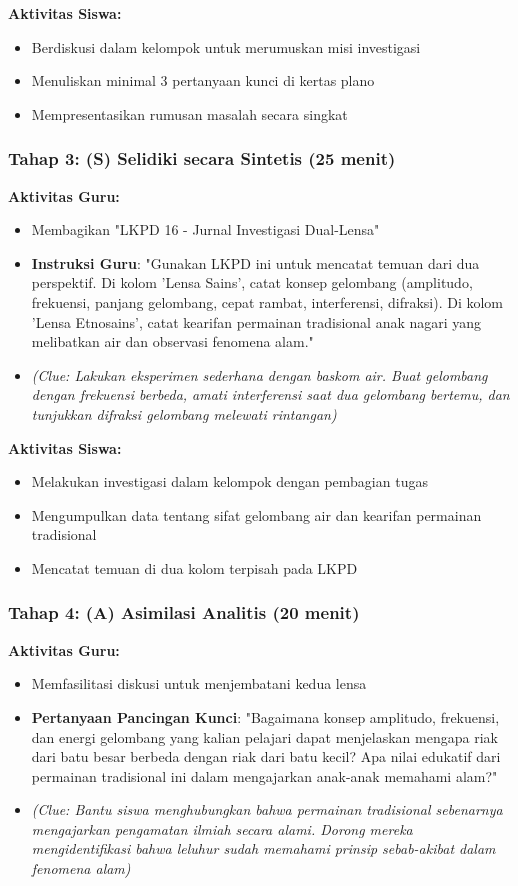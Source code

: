 \documentclass[12pt,a4paper]{article}
\begin{document}
\textbf{Aktivitas Siswa:}
\begin{itemize}
\item Berdiskusi dalam kelompok untuk merumuskan misi investigasi
\item Menuliskan minimal 3 pertanyaan kunci di kertas plano
\item Mempresentasikan rumusan masalah secara singkat
\end{itemize}

\subsubsection{Tahap 3: (S) Selidiki secara Sintetis (25 menit)}

\textbf{Aktivitas Guru:}
\begin{itemize}
\item Membagikan "LKPD 16 - Jurnal Investigasi Dual-Lensa"
\item \textbf{Instruksi Guru}: "Gunakan LKPD ini untuk mencatat temuan dari dua perspektif. Di kolom 'Lensa Sains', catat konsep gelombang (amplitudo, frekuensi, panjang gelombang, cepat rambat, interferensi, difraksi). Di kolom 'Lensa Etnosains', catat kearifan permainan tradisional anak nagari yang melibatkan air dan observasi fenomena alam."
\item \textit{(Clue: Lakukan eksperimen sederhana dengan baskom air. Buat gelombang dengan frekuensi berbeda, amati interferensi saat dua gelombang bertemu, dan tunjukkan difraksi gelombang melewati rintangan)}
\end{itemize}

\textbf{Aktivitas Siswa:}
\begin{itemize}
\item Melakukan investigasi dalam kelompok dengan pembagian tugas
\item Mengumpulkan data tentang sifat gelombang air dan kearifan permainan tradisional
\item Mencatat temuan di dua kolom terpisah pada LKPD
\end{itemize}

\subsubsection{Tahap 4: (A) Asimilasi Analitis (20 menit)}

\textbf{Aktivitas Guru:}
\begin{itemize}
\item Memfasilitasi diskusi untuk menjembatani kedua lensa
\item \textbf{Pertanyaan Pancingan Kunci}: "Bagaimana konsep amplitudo, frekuensi, dan energi gelombang yang kalian pelajari dapat menjelaskan mengapa riak dari batu besar berbeda dengan riak dari batu kecil? Apa nilai edukatif dari permainan tradisional ini dalam mengajarkan anak-anak memahami alam?"
\item \textit{(Clue: Bantu siswa menghubungkan bahwa permainan tradisional sebenarnya mengajarkan pengamatan ilmiah secara alami. Dorong mereka mengidentifikasi bahwa leluhur sudah memahami prinsip sebab-akibat dalam fenomena alam)}
\end{itemize}
\end{document}
